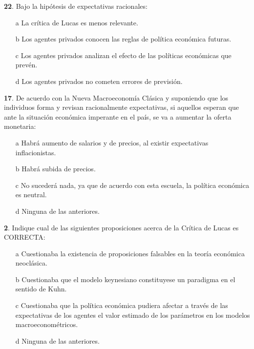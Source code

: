 \documentclass{nuevotema}
\begin{document}

\textbf{22}. Bajo la hipótesis de expectativas racionales:

\begin{enumerate}
\item[a] La crítica de Lucas es menos relevante.
\item[b] Los agentes privados conocen las reglas de política económica futuras.
\item[c] Los agentes privados analizan el efecto de las políticas económicas que prevén.
\item[d] Los agentes privados no cometen errores de previsión.
\end{enumerate}


\textbf{17}. De acuerdo con la Nueva Macroeconomía Clásica y suponiendo que los individuos forma y revisan racionalmente expectativas, si aquellos esperan que ante la situación económica imperante en el país, se va a aumentar la oferta monetaria:

\begin{enumerate}
	\item[a] Habrá aumento de salarios y de precios, al existir expectativas inflacionistas.
	\item[b] Habrá subida de precios.
	\item[c] No sucederá nada, ya que de acuerdo con esta escuela, la política económica es neutral.
	\item[d] Ninguna de las anteriores.
\end{enumerate}


\textbf{2}. Indique cual de las siguientes proposiciones acerca de la Crítica de Lucas es CORRECTA:

\begin{enumerate}
	\item[a] Cuestionaba la existencia de proposiciones falsables en la teoría económica neoclásica.
	\item[b] Cuestionaba que el modelo keynesiano constituyese un paradigma en el sentido de Kuhn.
	\item[c] Cuestionaba que la política económica pudiera afectar a través de las expectativas de los agentes el valor estimado de los parámetros en los modelos macroeconométricos.
	\item[d] Ninguna de las anteriores.
\end{enumerate}
\end{document}

